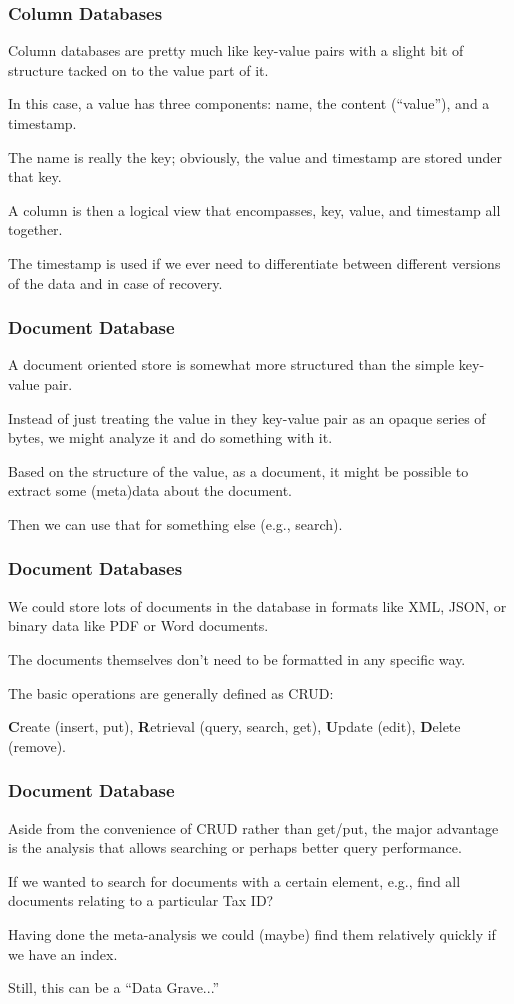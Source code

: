 \begin{frame}
\frametitle{Column Databases}

Column databases are pretty much like key-value pairs with a slight bit of structure tacked on to the value part of it. 

In this case, a value has three components: name, the content (``value''), and a timestamp. 

The name is really the key; obviously, the value and timestamp are stored under that key.

 A column is then a logical view that encompasses, key, value, and timestamp all together. 
 
 The timestamp is used if we ever need to differentiate between different versions of the data and in case of recovery.


\end{frame}


\begin{frame}
\frametitle{Document Database}

A document oriented store is somewhat more structured than the simple key-value pair. 

Instead of just treating the value in they key-value pair as an opaque series of bytes, we might analyze it and do something with it. 

Based on the structure of the value, as a document, it might be possible to extract some (meta)data about the document. 

Then we can use that for something else (e.g., search). 

\end{frame}



\begin{frame}
\frametitle{Document Databases}

We could store lots of documents in the database in formats like XML, JSON, or binary data like PDF or Word documents.

The documents themselves don't need to be formatted in any specific way.

The basic operations are generally defined as CRUD:

\textbf{C}reate (insert, put), \textbf{R}etrieval (query, search, get), \textbf{U}pdate (edit), \textbf{D}elete (remove).

\end{frame}



\begin{frame}
\frametitle{Document Database}

Aside from the convenience of CRUD rather than get/put, the major advantage is the analysis that allows searching or perhaps better query performance. 

If we wanted to search for documents with a certain element, e.g., find all documents relating to a particular Tax ID?

Having done the meta-analysis we could (maybe) find them relatively quickly if we have an index.

Still, this can be a ``Data Grave...''

\end{frame}



